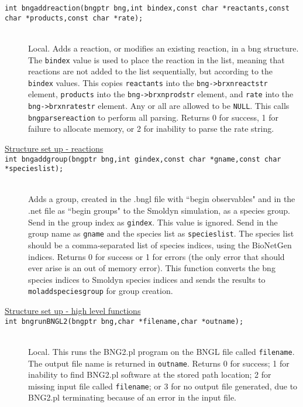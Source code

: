\documentclass {book}
\begin{document}
\begin{description}
\item[\texttt{int bngaddreaction(bngptr bng,int bindex,const char *reactants,const char *products,const char *rate);}]
\hfill \\
Local. Adds a reaction, or modifies an existing reaction, in a bng structure. The \texttt{bindex} value is used to place the reaction in the list, meaning that reactions are not added to the list sequentially, but according to the \texttt{bindex} values. This copies \texttt{reactants} into the \texttt{bng->brxnreactstr} element, \texttt{products} into the \texttt{bng->brxnprodstr} element, and \texttt{rate} into the \texttt{bng->brxnratestr} element. Any or all are allowed to be \texttt{NULL}. This calls \texttt{bngparsereaction} to perform all parsing. Returns 0 for success, 1 for failure to allocate memory, or 2 for inability to parse the rate string.

\item[\underline{Structure set up - reactions}]

\item[\texttt{int bngaddgroup(bngptr bng,int gindex,const char *gname,const char *specieslist);}]
\hfill \\
Adds a group, created in the .bngl file with ``begin observables" and in the .net file as ``begin groups" to the Smoldyn simulation, as a species group. Send in the group index as \texttt{gindex}. This value is ignored. Send in the group name as \texttt{gname} and the species list as \texttt{specieslist}. The species list should be a comma-separated list of species indices, using the BioNetGen indices. Returns 0 for success or 1 for errors (the only error that should ever arise is an out of memory error). This function converts the bng species indices to Smoldyn species indices and sends the results to \texttt{moladdspeciesgroup} for group creation.

\item[\underline{Structure set up - high level functions}]

\item[\texttt{int bngrunBNGL2(bngptr bng,char *filename,char *outname);}]
\hfill \\
Local. This runs the BNG2.pl program on the BNGL file called \texttt{filename}. The output file name is returned in \texttt{outname}. Returns 0 for success; 1 for inability to find BNG2.pl software at the stored path location; 2 for missing input file called \texttt{filename}; or 3 for no output file generated, due to BNG2.pl terminating because of an error in the input file.


\end{description}
\end{document}
